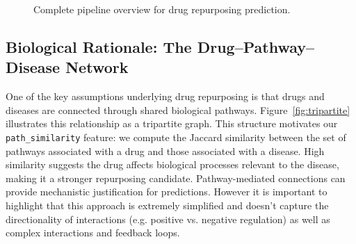 \begin{figure}[H]
        \caption{Complete pipeline overview for drug repurposing prediction.}
        \label{fig:pipeline-balanced}
\end{figure}


\subsection{Biological Rationale: The Drug--Pathway--Disease Network}

One of the key assumptions underlying drug repurposing is that drugs and diseases are connected through 
shared biological pathways. Figure~\ref{fig:tripartite} illustrates this relationship as a tripartite graph.
This structure motivates our \verb|path_similarity| feature: we compute the 
Jaccard similarity between the set of pathways associated with a drug and those associated with a disease. 
High similarity suggests the drug affects biological processes relevant to the disease, making it a stronger
 repurposing candidate. 
 Pathway-mediated connections can provide mechanistic justification for predictions.
 However it is important to highlight that this approach is extremely simplified
 and doesn't capture the directionality of interactions (e.g. positive vs. negative regulation) 
 as well as complex interactions and feedback loops.

 